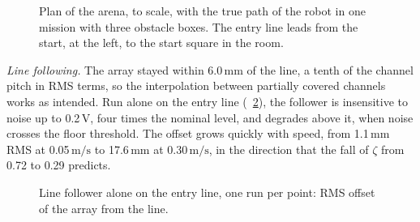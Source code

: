 \documentclass[conference,a4paper]{IEEEtran}
\newcommand{\unit}[1]{\ensuremath{\,\mathrm{#1}}}
\begin{document}
\begin{figure}[t]
  \centering
  \caption{Plan of the arena, to scale, with the true path of the robot in one mission
  with three obstacle boxes. The entry line leads from the start, at the left, to the start
  square in the room.}
  \label{fig:arena}\label{fig:path}
\end{figure}

\emph{Line following.} The array stayed within 6.0\unit{mm} of the line, a tenth of the
channel pitch in RMS terms, so the interpolation between partially covered channels works
as intended. Run alone on the entry line (\figurename~\ref{fig:line}), the follower is
insensitive to noise up to 0.2\unit{V}, four times the nominal level, and degrades above
it, when noise crosses the floor threshold. The offset grows quickly with speed, from
1.1\unit{mm} RMS at 0.05\unit{m/s} to 17.6\unit{mm} at 0.30\unit{m/s}, in the direction
that the fall of $\zeta$ from 0.72 to 0.29 predicts.

\begin{figure}[t]
  \centering
  \caption{Line follower alone on the entry line, one run per point: RMS offset of the array
  from the line.}
  \label{fig:line}
\end{figure}
\end{document}
